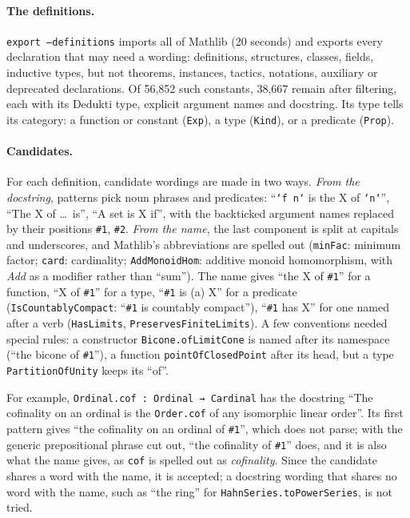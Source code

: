 \documentclass{easychair}
\newcommand{\ttt}[1]{\texttt{#1}}
\begin{document}
\paragraph{The definitions.} \ttt{export --definitions} imports all of Mathlib (20 seconds) and
exports every declaration that may need a wording: definitions, structures, classes, fields,
inductive types, but not theorems, instances, tactics, notations, auxiliary or deprecated
declarations. Of 56,852 such constants, 38,667 remain after filtering, each with its Dedukti
type, explicit argument names and docstring. Its type tells its category: a function or constant
(\ttt{Exp}), a type (\ttt{Kind}), or a predicate (\ttt{Prop}).

\paragraph{Candidates.} For each definition, candidate wordings are made in two ways.
\emph{From the docstring}, patterns pick noun phrases and predicates: ``\ttt{`f n`} is the X of
\ttt{`n`}'', ``The X of \ldots\ is'', ``A set is X if'', with the backticked argument names
replaced by their positions \ttt{\#1}, \ttt{\#2}. \emph{From the name}, the last component is
split at capitals and underscores, and Mathlib's abbreviations are spelled out (\ttt{minFac}:
minimum factor; \ttt{card}: cardinality; \ttt{AddMonoidHom}: additive monoid homomorphism,
with \emph{Add} as a modifier rather than ``sum''). The name gives ``the X of \ttt{\#1}'' for a
function, ``X of \ttt{\#1}'' for a type, ``\ttt{\#1} is (a) X'' for a predicate
(\ttt{IsCountablyCompact}: ``\ttt{\#1} is countably compact''), ``\ttt{\#1} has X'' for one
named after a verb (\ttt{HasLimits}, \ttt{PreservesFiniteLimits}). A few conventions needed
special rules: a constructor \ttt{Bicone.ofLimitCone} is named after its namespace (``the bicone
of \ttt{\#1}''), a function \ttt{pointOfClosedPoint} after its head, but a type
\ttt{PartitionOfUnity} keeps its ``of''.

For example, \ttt{Ordinal.cof : Ordinal → Cardinal} has the docstring ``The cofinality on an
ordinal is the \ttt{Order.cof} of any isomorphic linear order''. Its first pattern gives
``the cofinality on an ordinal of \ttt{\#1}'', which does not parse; with the generic
prepositional phrase cut out, ``the cofinality of \ttt{\#1}'' does, and it is also what the name
gives, as \ttt{cof} is spelled out as \emph{cofinality}. Since the candidate shares a word with
the name, it is accepted; a docstring wording that shares no word with the name, such as ``the
ring'' for \ttt{HahnSeries.toPowerSeries}, is not tried.
\end{document}
